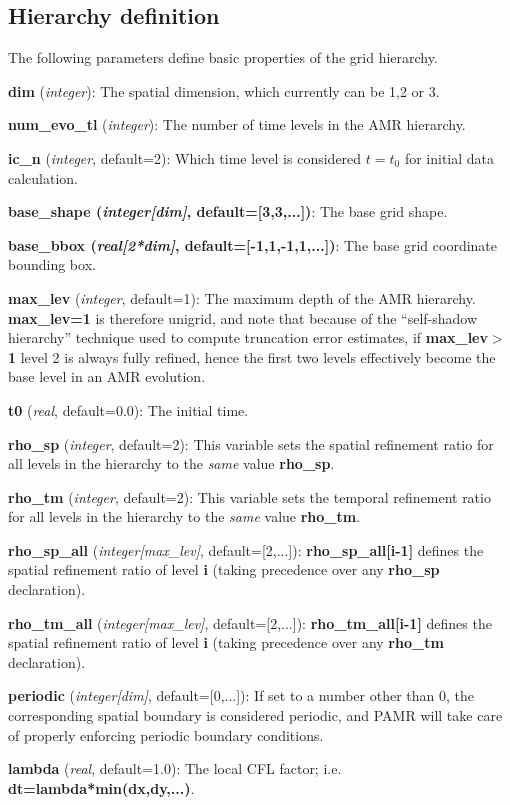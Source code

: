 \documentclass[aps,amssymb,unsortedaddress,nofootinbib]{revtex4}
\def\lsep{\itemsep 0.05in}
\begin{document}
\subsection{Hierarchy definition}

The following parameters define basic properties of the 
grid hierarchy.

\begin{list}{}{\lsep}
\item {\bf dim} ({\em integer}): 
      The spatial dimension, which currently can be 1,2 or 3.
\item {\bf num\_evo\_tl} ({\em integer}): 
      The number of time levels in the AMR hierarchy.
\item {\bf ic\_n} ({\em integer}, default=2):
      Which time level is considered $t=t_0$ for initial data calculation.
\item {\bf base\_shape ({\em integer[dim]}, default=[3,3,...])}:
      The base grid shape.
\item {\bf base\_bbox ({\em real[2*dim]}, default=[-1,1,-1,1,...])}:
      The base grid coordinate bounding box.
\item {\bf max\_lev} ({\em integer}, default=1):
      The maximum depth of the AMR hierarchy. {\bf max\_lev=1} is therefore
      unigrid, and note that because of the ``self-shadow hierarchy'' 
      technique used to compute truncation error estimates, if {\bf max\_lev$>$1}
      level 2 is always fully refined, hence the first two levels effectively
      become the base level in an AMR evolution.
\item {\bf t0} ({\em real}, default=0.0):
      The initial time.
\item {\bf rho\_sp} ({\em integer}, default=2):
      This variable sets the spatial refinement ratio for all levels in the hierarchy
      to the {\em same} value {\bf rho\_sp}.
\item {\bf rho\_tm} ({\em integer}, default=2):
      This variable sets the temporal refinement ratio for all levels in the hierarchy
      to the {\em same} value {\bf rho\_tm}.
\item {\bf rho\_sp\_all} ({\em integer[max\_lev]}, default=[2,...]):
      {\bf rho\_sp\_all[i-1]} defines the spatial refinement ratio of level {\bf i}
      (taking precedence over any {\bf rho\_sp} declaration).
\item {\bf rho\_tm\_all} ({\em integer[max\_lev]}, default=[2,...]):
      {\bf rho\_tm\_all[i-1]} defines the spatial refinement ratio of level {\bf i}
      (taking precedence over any {\bf rho\_tm} declaration).
\item {\bf periodic} ({\em integer[dim]}, default=[0,...]):
      If set to a number other than 0, the corresponding spatial boundary is considered periodic,
      and PAMR will take care of properly enforcing periodic boundary conditions.
\item {\bf lambda} ({\em real}, default=1.0):
      The local CFL factor; i.e. {\bf dt=lambda*min(dx,dy,...)}.
\end{list}
\end{document}
